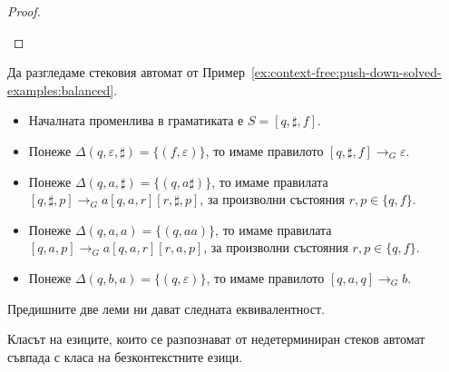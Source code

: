 \begin{proof}
\begin{description}
\begin{itemize}
    \end{itemize}
  \end{description}
\end{proof}

\begin{extra}
  \begin{example}
    Да разгледаме стековия автомат от Пример~\ref{ex:context-free:push-down-solved-examples:balanced}.
    \begin{itemize}
    \item
      Началната променлива в граматиката е $S = [q,\sharp,f]$.
    \item
      Понеже $\Delta(q, \varepsilon, \sharp) = \{(f, \varepsilon)\}$, то имаме правилото
      $[q,\sharp,f] \to_G \varepsilon$.
    \item
      Понеже $\Delta(q, a, \sharp) = \{(q, a\sharp)\}$, то имаме правилата
      $[q,\sharp,p] \to_G a[q,a,r][r,\sharp,p]$, за произволни състояния $r,p \in \{q,f\}$.
    \item
      Понеже $\Delta(q, a, a) = \{(q, aa)\}$, то имаме правилата
      $[q,a,p] \to_G a[q,a,r][r,a,p]$, за произволни състояния $r,p \in \{q,f\}$.
    \item
      Понеже $\Delta(q, b, a) = \{(q, \varepsilon)\}$, то имаме правилото
      $[q,a,q] \to_G b$.
    \end{itemize}
  \end{example}
\end{extra}

Предишните две леми ни дават следната еквивалентност.
\begin{important}
  \begin{theorem}
    \label{th:push-down-context-free}
    Класът на езиците, които се разпознават от недетерминиран стеков автомат съвпада с
    класа на безконтекстните езици.
  \end{theorem}
\end{important}

